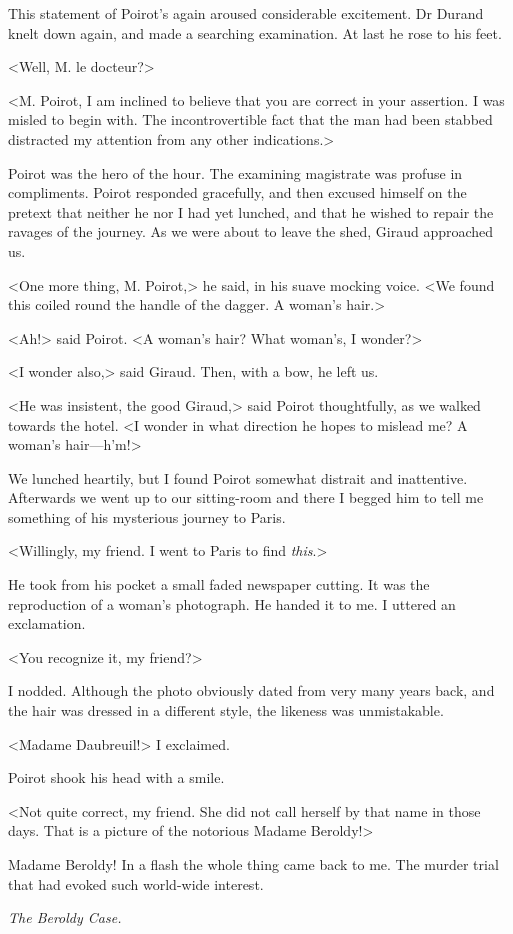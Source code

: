  This statement of Poirot's again aroused considerable excitement. Dr Durand knelt down again, and made a searching examination. At last he rose to his feet. 

 <Well, M. le docteur?> 

 <M. Poirot, I am inclined to believe that you are correct in your assertion. I was misled to begin with. The incontrovertible fact that the man had been stabbed distracted my attention from any other indications.> 

 Poirot was the hero of the hour. The examining magistrate was profuse in compliments. Poirot responded gracefully, and then excused himself on the pretext that neither he nor I had yet lunched, and that he wished to repair the ravages of the journey. As we were about to leave the shed, Giraud approached us. 

 <One more thing, M. Poirot,> he said, in his suave mocking voice. <We found this coiled round the handle of the dagger. A woman's hair.> 

 <Ah!> said Poirot. <A woman's hair? What woman's, I wonder?> 

 <I wonder also,> said Giraud. Then, with a bow, he left us. 

 <He was insistent, the good Giraud,> said Poirot thoughtfully, as we walked towards the hotel. <I wonder in what direction he hopes to mislead me? A woman's hair—h'm!> 

 We lunched heartily, but I found Poirot somewhat distrait and inattentive. Afterwards we went up to our sitting-room and there I begged him to tell me something of his mysterious journey to Paris. 

 <Willingly, my friend. I went to Paris to find \emph{this}.> 

 He took from his pocket a small faded newspaper cutting. It was the reproduction of a woman's photograph. He handed it to me. I uttered an exclamation. 

 <You recognize it, my friend?> 

 I nodded. Although the photo obviously dated from very many years back, and the hair was dressed in a different style, the likeness was unmistakable. 

 <Madame Daubreuil!> I exclaimed. 

 Poirot shook his head with a smile. 

 <Not quite correct, my friend. She did not call herself by that name in those days. That is a picture of the notorious Madame Beroldy!> 

 Madame Beroldy! In a flash the whole thing came back to me. The murder trial that had evoked such world-wide interest. 

 \emph{The Beroldy Case.}